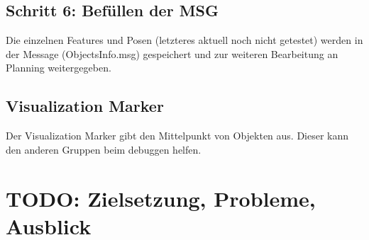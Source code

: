 \documentclass{suturo}
\begin{document}
\subsection*{Schritt 6: Befüllen der MSG}
Die einzelnen Features und Posen (letzteres aktuell noch nicht getestet) werden in der Message (ObjectsInfo.msg) gespeichert und zur weiteren Bearbeitung an Planning weitergegeben.

\subsection*{Visualization Marker}
Der Visualization Marker gibt den Mittelpunkt von Objekten aus. Dieser kann den anderen Gruppen beim debuggen helfen.

\section*{TODO: Zielsetzung, Probleme, Ausblick}
\end{document}

